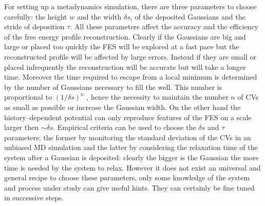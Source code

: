 For setting up a metadynamics simulation, there are three parameters to choose carefully: the height $w$ and the
width $\delta s_i$ of the deposited Gaussians and the stride of deposition $\tau$. All these parameters affect
the accuracy and the efficiency of the free energy profile reconstruction. Clearly if the Gaussians are big and
large or placed too quickly the \ac{FES} will be explored at a fast pace but the reconstructed profile will be
affected by large errors. Instead if they are small or placed infrequently the reconstruction will be accurate
but will take a longer time. Moreover the time required to escape from a local minimum is determined by the
number of Gaussians necessary to fill the well. This number is proportional to $(1/\delta s)^n$
\cite{MetadReview}, hence the necessity to maintain the number $n$ of \acp{CV} as small as possible or increase
the Gaussian width. On the other hand the history--dependent potential can only reproduce features of the
\ac{FES} on a scale larger then $\sim \delta s$. Empirical criteria can be used to choose the $\delta s$ and
$\tau$ parameters; the former by monitoring the standard deviation of the \acp{CV} in an unbiased \ac{MD}
simulation and the latter by considering the relaxation time of the system after a Gaussian is deposited: clearly
the bigger is the Gaussian the more time is needed by the system to relax. However it does not exist an universal
and general recipe to choose these parameters, only some knowledge of the system and process under study can give
useful hints. They can certainly be fine tuned in successive steps.


